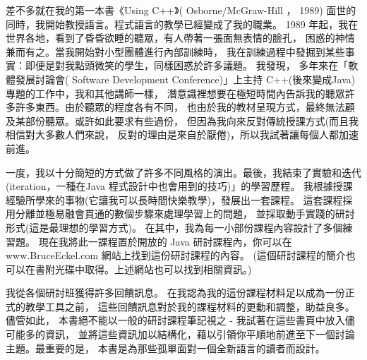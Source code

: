 差不多就在我的第一本書《Using C++》( Osborne/McGraw-Hill ， 1989)
面世的同時，我開始教授語言。程式語言的教學已經變成了我的職業。
1989 年起，我在世界各地，看到了昏昏欲睡的聽眾，有人帶著一張面無表情的臉孔，
困惑的神情兼而有之。當我開始對小型團體進行內部訓練時，
我在訓練過程中發掘到某些事實：即便是對我點頭微笑的學生，同樣困惑於許多議題。
我發現， 多年來在「軟體發展討論會( Software Development Conference)」上主持
C++(後來變成Java)專題的工作中，我和其他講師一樣，
潛意識裡想要在極短時間內告訴我的聽眾許多許多東西。由於聽眾的程度各有不同，
也由於我的教材呈現方式，最終無法顧及某部份聽眾。或許如此要求有些過份，
但因為我向來反對傳統授課方式(而且我相信對大多數人們來說，
反對的理由是來自於厭倦)，所以我試著讓每個人都加速前進。

一度，我以十分簡短的方式做了許多不同風格的演出。最後，我結束了實驗和迭代
(iteration，一種在Java 程式設計中也會用到的技巧)」的學習歷程。
我根據授課經驗所學來的事物(它讓我可以長時間快樂教學)，發展出一套課程。
這套課程採用分離並極易融會貫通的數個步驟來處理學習上的問題，
並採取動手實踐的研討形式(這是最理想的學習方式)。
在其中，我為每一小部份課程內容設計了多個練習題。
現在我將此一課程置於開放的 Java 研討課程內，你可以在
www.BruceEckel.com 網站上找到這份研討課程的內容。
(這個研討課程的簡介也可以在書附光碟中取得。上述網站也可以找到相關資訊。)

我從各個研討班獲得許多回饋訊息。
在我認為我的這份課程材料足以成為一份正式的教學工具之前，
這些回饋訊息對於我的課程材料的更動和調整，助益良多。儘管如此，
本書絕不能以一般的研討課程筆記視之 - 我試著在這些書頁中放入儘可能多的資訊，
並將這些資訊加以結構化，藉以引領你平順地前進至下一個討論主題。最重要的是，
本書是為那些孤單面對一個全新語言的讀者而設計。

